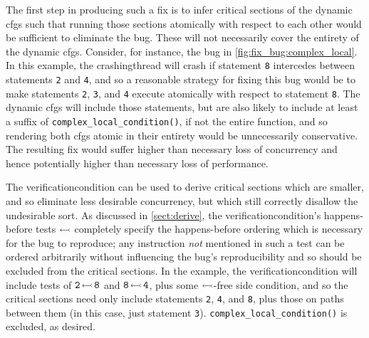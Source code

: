 \noindent
The first step in producing such a fix is to infer critical sections
of the dynamic \glspl{cfg} such that running those sections atomically
with respect to each other would be sufficient to eliminate the bug.
These will not necessarily cover the entirety of the dynamic
\glspl{cfg}.  Consider, for instance, the bug in
\autoref{fig:fix_bug:complex_local}.  In this example, the
\gls{crashingthread} will crash if statement \texttt{8} intercedes
between statements \texttt{2} and \texttt{4}, and so a reasonable
strategy for fixing this bug would be to make statements \texttt{2},
\texttt{3}, and \texttt{4} execute atomically with respect to
statement \texttt{8}.  The dynamic \glspl{cfg} will include those
statements, but are also likely to include at least a suffix of
\texttt{complex\_local\_condition()}, if not the entire function, and
so rendering both \glspl{cfg} atomic in their entirety would be
unnecessarily conservative.  The resulting fix would suffer higher
than necessary loss of concurrency and hence potentially higher than
necessary loss of performance.

The \gls{verificationcondition} can be used to derive critical
sections which are smaller, and so eliminate less desirable
concurrency, but which still correctly disallow the undesirable sort.
As discussed in \autoref{sect:derive}, the
\gls{verificationcondition}'s happens-before tests
$\leftarrowtail$ completely specify the happens-before ordering
which is necessary for the bug to reproduce; any instruction
\emph{not} mentioned in such a test can be ordered arbitrarily without
influencing the bug's reproducibility and so should be excluded from
the critical sections.  In the example, the
\gls{verificationcondition} will include tests of $\tt
  2\,{\leftarrowtail}\,\tt 8$ and $\tt 8\,{\leftarrowtail}\,\tt 4$, plus some
$\leftarrowtail$-free \gls{side condition}, and so the critical
sections need only include statements \texttt{2}, \texttt{4}, and
\texttt{8}, plus those on paths between them (in this case, just
statement \texttt{3}).  \texttt{complex\_local\_condition()} is
excluded, as desired.



